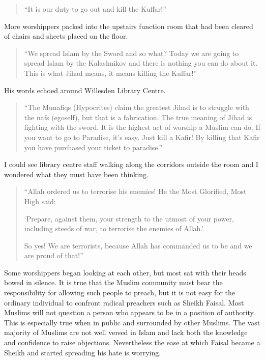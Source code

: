 \documentclass[12pt]{memoir}
\def\/{\discretionary{/}{}{/}}
\begin{document}
\begin{quote}
“It is our duty to go out and kill the Kuffar!”
\end{quote}

More worshippers packed into the upstairs function room
that had been cleared of chairs and sheets placed on the floor.

\begin{quote}
“We spread Islam by the Sword and so what? Today we are going to spread
Islam by the Kalashnikov and there is nothing you can do about it.
This is what Jihad means, it means killing the Kuffar!”
\end{quote}

His words echoed around Willesden Library Centre.

\begin{quote}
“The Munafiqs (Hypocrites) claim the greatest Jihad is to struggle
with the nafs (ego\/self), but that is a fabrication.
The true meaning of Jihad is fighting with the sword.
It is the highest act of worship a Muslim can do.
If you want to go to Paradise, it’s easy.
Just kill a Kafir!
By killing that Kafir you have purchased your ticket to paradise.”
\end{quote}

I could see library centre staff walking along the corridors outside the room
and I wondered what they must have been thinking.

\begin{quote}
“Allah ordered us to terrorise his enemies!
He the Most Glorified, Most High said;

‘Prepare, against them, your strength to the utmost of your power,
including steeds of war, to terrorise the enemies of Allah.’

So yes! We are terrorists, because Allah has commanded us
to be and we are proud of that!”
\end{quote}

Some worshippers began looking at each other,
but most sat with their heads bowed in silence.
It is true that the Muslim community must bear the responsibility
for allowing such people to preach,
but it is not easy for the ordinary individual
to confront radical preachers such as Sheikh Faisal.
Most Muslims will not question a person
who appears to be in a position of authority.
This is especially true when in public and surrounded by other Muslims.
The vast majority of Muslims are not well versed in Islam
and lack both the knowledge and confidence to raise objections.
Nevertheless the ease at which Faisal became a Sheikh
and started spreading his hate is worrying.
\end{document}
